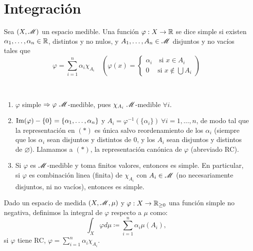 \chapter{Integración}


\begin{definition}
	Sea $(X, \mathscr{M})$ un espacio medible. Una función $\varphi : X \to \mathbb{R}$ se dice simple si existen $\alpha_{1},\dots,\alpha_{n} \in \mathbb{R}$, distintos y no nulos, y $A_{1},\dots,A_{n} \in \mathscr{M}$ disjuntos y no vacíos tales que
	\[ \varphi = \sum_{i=1}^{n} \alpha_{i} \chi_{A_{i}} \quad \left( \varphi(x) = \begin{cases}
		\alpha_{i} \quad \text{si } x \in A_{i} \\
		0 \quad \ \text{si } x \not\in \bigcup A_{i}
	\end{cases} \right) \tag{$*$} \]
\end{definition}
\begin{remark}~
	\begin{enumerate}
		\item $\varphi$ simple $\implies \varphi \ \mscr{M}$-medible, pues $\chi_{A_{i}} \ \mscr{M}$-medible $\forall i$.

		\item $\operatorname{Im}(\varphi) - \{0\} = \{\alpha_{1},\dots,\alpha_{n}\}$ y $A_{i} = \varphi^{-1}(\{\alpha_{i}\}) \ \forall i = 1, \dots, n$, de modo tal que la representación en $(*)$ es única salvo reordenamiento de los $\alpha_{i}$ (siempre que los $\alpha_{i}$ sean disjuntos y distintos de $0$, y los $A_{i}$ sean disjuntos y distintos de $\varnothing$). Llamamos a $(*)$, la representación canónica de $\varphi$ (abreviado RC).

		\item Si $\varphi$ es $\mathscr{M}$-medible y toma finitos valores, entonces es simple. En particular, si $\varphi$ es combinación linea (finita) de $\chi_{A_{i}}$ con $A_{i} \in \mathscr{M}$ (no necesariamente disjuntos, ni no vacíos), entonces es simple.
	\end{enumerate}
\end{remark}

\begin{definition}
	Dado un espacio de medida $(X, \mathscr{M}, \mu)$ y $\varphi : X \to \mathbb{R}_{\geq 0}$ una función simple no negativa, definimos la integral de $\varphi$ respecto a $\mu$ como:
	\[ \int_{X} \varphi d\mu \coloneq \sum_{i=1}^{n} \alpha_{i} \mu(A_{i}), \]
	si $\varphi$ tiene RC, $\varphi = \sum_{i=1}^{n} \alpha_{i} \chi_{A_{i}}$.
\end{definition}

